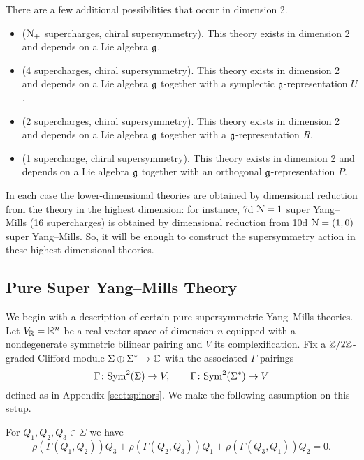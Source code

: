 \documentclass[10pt, oneside]{article}
\begin{document}
There are a few additional possibilities that occur in dimension 2.

\begin{itemize}
\item ($\mathcal N_+$ supercharges, chiral supersymmetry). This theory exists in dimension 2 and depends on a Lie algebra $\mathfrak g$.

\item (4 supercharges, chiral supersymmetry). This theory exists in dimension 2 and depends on a Lie algebra $\mathfrak g$ together with a symplectic $\mathfrak g$-representation $U$.

\item (2 supercharges, chiral supersymmetry). This theory exists in dimension 2 and depends on a Lie algebra $\mathfrak g$ together with a $\mathfrak g$-representation $R$.

\item (1 supercharge, chiral supersymmetry). This theory exists in dimension 2 and depends on a Lie algebra $\mathfrak g$ together with an orthogonal $\mathfrak g$-representation $P$.
\end{itemize}

In each case the lower-dimensional theories are obtained by dimensional reduction from the theory in the highest dimension: for instance, 7d $\mathcal{N}=1$ super Yang--Mills (16 supercharges) is obtained by dimensional reduction from 10d $\mathcal{N}=(1, 0)$ super Yang--Mills. So, it will be enough to construct the supersymmetry action in these highest-dimensional theories.

\subsection{Pure Super Yang--Mills Theory}
\label{sect:gaugemultipletSUSY}

We begin with a description of certain pure supersymmetric Yang--Mills theories. Let $V_\mathbb R = \mathbb R^n$ be a real vector space of dimension $n$ equipped with a nondegenerate symmetric bilinear pairing and $V$ its complexification. 
Fix a $\mathbb Z/2\mathbb Z$-graded Clifford module $\Sigma\oplus \Sigma^*\rightarrow \mathbb C$ with the associated $\Gamma$-pairings
\[\Gamma\colon {\rm Sym}^2(\Sigma)\rightarrow V,\qquad \Gamma\colon {\rm Sym}^2(\Sigma^*)\rightarrow V\]
defined as in Appendix \ref{sect:spinors}. We make the following assumption on this setup.

\begin{assumption}
For $Q_1, Q_2, Q_3\in\Sigma$ we have
\[\rho(\Gamma(Q_1, Q_2))Q_3 + \rho(\Gamma(Q_2, Q_3))Q_1 + \rho(\Gamma(Q_3, Q_1))Q_2 = 0.\]
\label{assumption:3psi}
\end{assumption}
\end{document}
